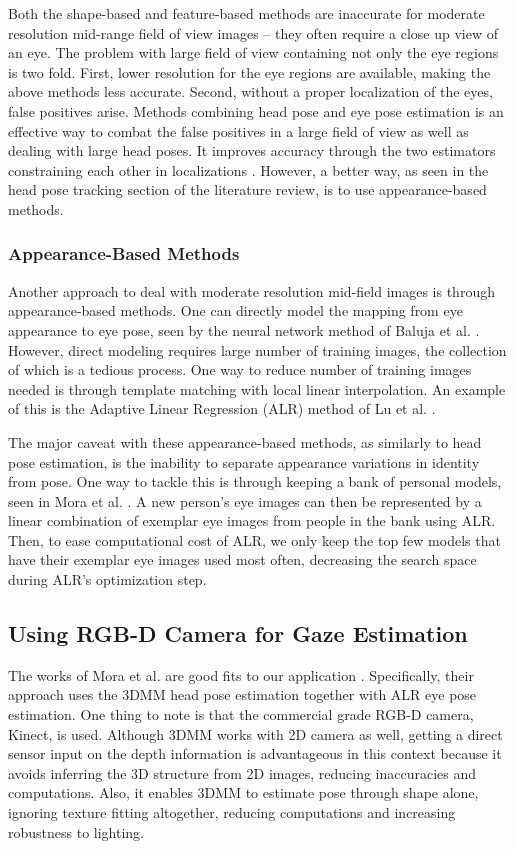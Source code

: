 \documentclass{ut-thesis}
\begin{document}
Both the shape-based and feature-based methods are inaccurate for moderate resolution mid-range field of view images -- they often require a close up view of an eye.  The problem with large field of view containing not only the eye regions is two fold.  First, lower resolution for the eye regions are available, making the above methods less accurate.  Second, without a proper localization of the eyes, false positives arise.  Methods combining head pose and eye pose estimation is an effective way to combat the false positives in a large field of view as well as dealing with large head poses.  It improves accuracy through the two estimators constraining each other in localizations \cite{valenti2012combining}.  However, a better way, as seen in the head pose tracking section of the literature review, is to use appearance-based methods.


\subsubsection{Appearance-Based Methods}
Another approach to deal with moderate resolution mid-field images is through appearance-based methods.  One can directly model the mapping from eye appearance to eye pose, seen by the neural network method of Baluja et al. \cite{baluja1994non}.  However, direct modeling requires large number of training images, the collection of which is a tedious process.  One way to reduce number of training images needed is through template matching with local linear interpolation.  An example of this is the Adaptive Linear Regression (ALR) method of Lu et al. \cite{lu2011inferring}.


The major caveat with these appearance-based methods, as similarly to head pose estimation, is the inability to separate appearance variations in identity from pose.  One way to tackle this is through keeping a bank of personal models, seen in Mora et al. \cite{funes2013person}.  A new person's eye images can then be represented by a linear combination of exemplar eye images from people in the bank using ALR.  Then, to ease computational cost of ALR, we only keep the top few models that have their exemplar eye images used most often, decreasing the search space during ALR's optimization step.


\subsection{Using RGB-D Camera for Gaze Estimation}
The works of Mora et al. are good fits to our application \cite{funes2012gaze, funes2013person}.  Specifically, their approach uses the 3DMM head pose estimation together with ALR eye pose estimation.  One thing to note is that the commercial grade RGB-D camera, Kinect, is used.  Although 3DMM works with 2D camera as well, getting a direct sensor input on the depth information is advantageous in this context because it avoids inferring the 3D structure from 2D images, reducing inaccuracies and computations. Also, it enables 3DMM to estimate pose through shape alone, ignoring texture fitting altogether, reducing computations and increasing robustness to lighting.
\end{document}
